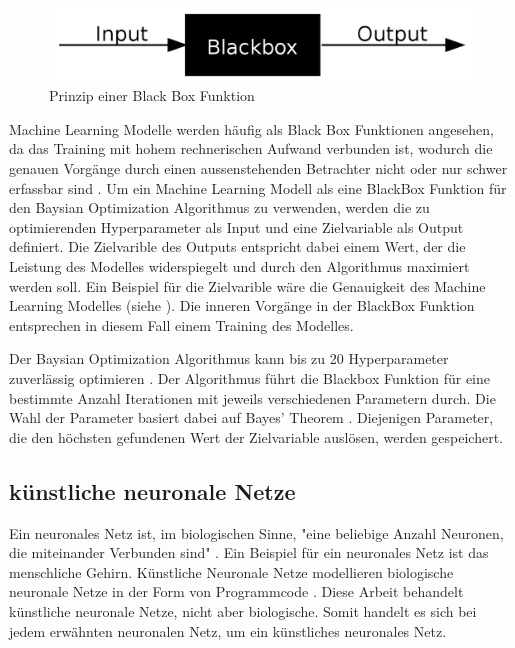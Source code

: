\begin{figure}[!ht]
    \centering
    \includegraphics[width=\textwidth-2cm]{images/theorie/blackbox.png}
    \caption{Prinzip einer Black Box Funktion \cite{noauthor_fileblackboxsvg_nodate}}
    \label{fig:blackbox}
\end{figure}


Machine Learning Modelle werden häufig als Black Box Funktionen angesehen, da
das Training mit hohem rechnerischen Aufwand verbunden ist, wodurch die genauen
Vorgänge durch einen aussenstehenden Betrachter nicht oder nur schwer erfassbar
sind \cite{robbins_machine_2017}. Um ein Machine Learning Modell als eine BlackBox Funktion für
den Baysian Optimization Algorithmus zu verwenden, werden die zu optimierenden
Hyperparameter als Input und eine Zielvariable als Output definiert. Die
Zielvarible des Outputs entspricht dabei einem Wert, der die Leistung des
Modelles widerspiegelt und durch den Algorithmus maximiert werden soll. Ein
Beispiel für die Zielvarible wäre die Genauigkeit des Machine Learning Modelles
(siehe ). Die inneren Vorgänge in der BlackBox Funktion
entsprechen in diesem Fall einem Training des Modelles.

Der Baysian Optimization Algorithmus kann bis zu 20 Hyperparameter zuverlässig
optimieren \cite{moriconi_high-dimensional_2020}. Der Algorithmus führt die Blackbox Funktion für eine
bestimmte Anzahl Iterationen mit jeweils verschiedenen Parametern durch. Die
Wahl der Parameter basiert dabei auf Bayes' Theorem \cite[S. 7]{garnett_bayesian_nodate}.
Diejenigen Parameter, die den höchsten gefundenen Wert der Zielvariable
auslösen, werden gespeichert.


\subsection{künstliche neuronale Netze}\label{sub:t_ml_nn} Ein neuronales Netz
ist, im biologischen Sinne, "eine beliebige Anzahl Neuronen, die miteinander
Verbunden sind" \cite{noauthor_neuronales_2021}. Ein Beispiel für ein neuronales
Netz ist das menschliche Gehirn. Künstliche Neuronale Netze modellieren
biologische neuronale Netze in der Form von Programmcode
\cite{noauthor_artificial_nodate}. Diese Arbeit behandelt künstliche neuronale
Netze, nicht aber biologische. Somit handelt es sich bei jedem erwähnten
neuronalen Netz, um ein künstliches neuronales Netz.

